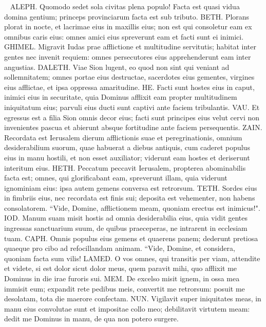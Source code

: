 
\begin{biblechapter}   
\verse ALEPH. Quomodo sedet sola civitas plena populo! Facta est quasi vidua domina gentium; princeps provinciarum facta est sub tributo. 
\verse BETH. Plorans plorat in nocte, et lacrimae eius in maxillis eius; non est qui consoletur eam ex omnibus caris eius: omnes amici eius spreverunt eam et facti sunt ei inimici. 
\verse GHIMEL. Migravit Iudas prae afflictione et multitudine servitutis; habitat inter gentes nec invenit requiem: omnes persecutores eius apprehenderunt eam inter angustias. 
\verse DALETH. Viae Sion lugent, eo quod non sint qui veniant ad sollemnitatem; omnes portae eius destructae, sacerdotes eius gementes, virgines eius afflictae, et ipsa oppressa amaritudine. 
\verse HE. Facti sunt hostes eius in caput, inimici eius in securitate, quia Dominus afflixit eam propter multitudinem iniquitatum eius; parvuli eius ducti sunt captivi ante faciem tribulantis. 
\verse VAU. Et egressus est a filia Sion omnis decor eius; facti sunt principes eius velut cervi non invenientes pascua et abierunt absque fortitudine ante faciem persequentis. 
\verse ZAIN. Recordata est Ierusalem dierum afflictionis suae et peregrinationis, omnium desiderabilium suorum, quae habuerat a diebus antiquis, cum caderet populus eius in manu hostili, et non esset auxiliator; viderunt eam hostes et deriserunt interitum eius. 
\verse HETH. Peccatum peccavit Ierusalem, propterea abominabilis facta est; omnes, qui glorificabant eam, spreverunt illam, quia viderunt ignominiam eius: ipsa autem gemens conversa est retrorsum. 
\verse TETH. Sordes eius in fimbriis eius, nec recordata est finis sui; deposita est vehementer, non habens consolatorem. “Vide, Domine, afflictionem meam, quoniam erectus est inimicus!". 
\verse IOD. Manum suam misit hostis ad omnia desiderabilia eius, quia vidit gentes ingressas sanctuarium suum, de quibus praeceperas, ne intrarent in ecclesiam tuam. 
\verse CAPH. Omnis populus eius gemens et quaerens panem; dederunt pretiosa quaeque pro cibo ad refocillandam animam. “Vide, Domine, et considera, quoniam facta sum vilis! 
\verse LAMED. O vos omnes, qui transitis per viam, attendite et videte, si est dolor sicut dolor meus, quem paravit mihi, quo afflixit me Dominus in die irae furoris sui. 
\verse MEM. De excelso misit ignem, in ossa mea immisit eum; expandit rete pedibus meis, convertit me retrorsum: posuit me desolatam, tota die maerore confectam. 
\verse NUN. Vigilavit super iniquitates meas, in manu eius convolutae sunt et impositae collo meo; debilitavit virtutem meam: dedit me Dominus in manu, de qua non potero surgere. 

\end{biblechapter}
